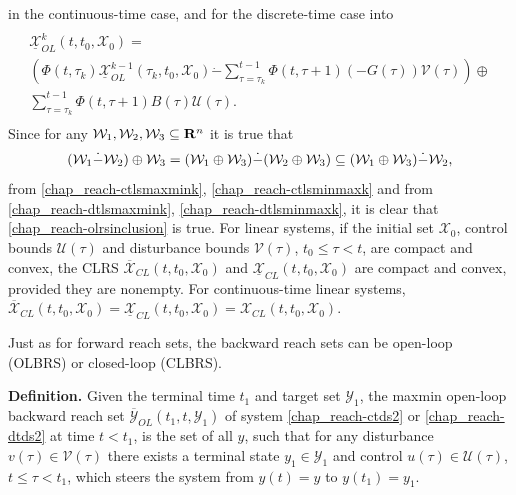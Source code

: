 \documentclass[letterpaper,10pt,english]{sphinxmanual}
\begin{document}
in the continuous-time case, and for the discrete-time case into
\label{chap_reach:equation-dtlsminmaxk}\begin{gather}
\begin{split}\begin{array}{l}
\underline{{\mathcal X}}_{OL}^k(t, t_0, {\mathcal X}_0) = \\
\left(\Phi(t, \tau_k)\underline{{\mathcal X}}_{OL}^{k-1}(\tau_k, t_0, {\mathcal X}_0) \dot{-}
\sum_{\tau=\tau_k}^{t-1}\Phi(t, \tau+1)(-G(\tau)){\mathcal V}(\tau)\right)
\oplus \\
\sum_{\tau=\tau_k}^{t-1}\Phi(t, \tau+1)B(\tau){\mathcal U}(\tau).
\end{array}\end{split}\label{chap_reach-dtlsminmaxk}
\end{gather}
Since for any
${\mathcal W}_1, {\mathcal W}_2, {\mathcal W}_3 \subseteq {\bf R}^n$
it is true that
\begin{gather}
\begin{split}({\mathcal W}_1 \dot{-} {\mathcal W}_2) \oplus {\mathcal W}_3 =
({\mathcal W}_1 \oplus {\mathcal W}_3) \dot{-} ({\mathcal W}_2 \oplus {\mathcal W}_3) \subseteq
({\mathcal W}_1 \oplus {\mathcal W}_3) \dot{-} {\mathcal W}_2,\end{split}\notag
\end{gather}
from \eqref{chap_reach-ctlsmaxmink}, \eqref{chap_reach-ctlsminmaxk} and from \eqref{chap_reach-dtlsmaxmink},
\eqref{chap_reach-dtlsminmaxk}, it is clear that \eqref{chap_reach-olrsinclusion} is true.
For linear systems, if the initial set ${\mathcal X}_0$, control
bounds ${\mathcal U}(\tau)$ and disturbance bounds
${\mathcal V}(\tau)$, $t_0\leqslant\tau<t$, are compact and
convex, the CLRS
$\overline{{\mathcal X}}_{CL}(t, t_0, {\mathcal X}_0)$ and
$\underline{{\mathcal X}}_{CL}(t, t_0, {\mathcal X}_0)$ are
compact and convex, provided they are nonempty. For continuous-time
linear systems,
$\overline{{\mathcal X}}_{CL}(t, t_0, {\mathcal X}_0) = \underline{{\mathcal X}}_{CL}(t, t_0, {\mathcal X}_0) = {\mathcal X}_{CL}(t, t_0, {\mathcal X}_0)$.

Just as for forward reach sets, the backward reach sets can be open-loop
(OLBRS) or closed-loop (CLBRS).

\textbf{Definition.} Given the terminal time $t_1$ and target set
${\mathcal Y}_1$, the maxmin open-loop backward reach set
$\overline{{\mathcal Y}}_{OL}(t_1, t, {\mathcal Y}_1)$ of system
\eqref{chap_reach-ctds2} or \eqref{chap_reach-dtds2} at time $t<t_1$, is the set of all $y$,
such that for any disturbance $v(\tau)\in{\mathcal V}(\tau)$ there
exists a terminal state $y_1\in{\mathcal Y}_1$ and control
$u(\tau)\in{\mathcal U}(\tau)$, $t\leqslant\tau<t_1$, which
steers the system from $y(t)=y$ to $y(t_1)=y_1$.
\end{document}
